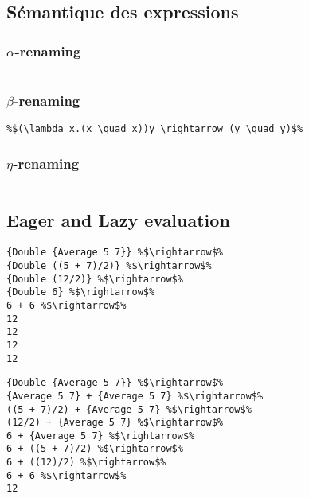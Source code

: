 \documentclass{report}
\begin{document}
\subsection{Sémantique des expressions}
\subsubsection{$\alpha$-renaming}
\begin{lstlisting}[escapechar=\%]
%$\lambda$% x. x %$\rightarrow_{\alpha}\lambda$%y. y
\end{lstlisting}
\subsubsection{$\beta$-renaming}
\begin{lstlisting}[escapechar=\%]
%$(\lambda x.t_1) t_2 \rightarrow t_1[::=t_2]$%
%$(\lambda x.(x \quad x))y \rightarrow (y \quad y)$%
\end{lstlisting}
\subsubsection{$\eta$-renaming}
\begin{lstlisting}[escapechar=\%]
%$\lambda x.(t \quad x) \rightarrow t$ if $x \notin FV(t)$%
\end{lstlisting}

\subsection{Eager and Lazy evaluation}
\begin{center}
\begin{minipage}[t]{0.49\linewidth}
\begin{lstlisting}[escapechar=\%]
{Double {Average 5 7}} %$\rightarrow$%
{Double ((5 + 7)/2)} %$\rightarrow$%
{Double (12/2)} %$\rightarrow$%
{Double 6} %$\rightarrow$%
6 + 6 %$\rightarrow$%
12
12
12
12
\end{lstlisting}
\end{minipage}
%
\begin{minipage}[t]{0.45\linewidth}
\begin{lstlisting}[escapechar=\%]
{Double {Average 5 7}} %$\rightarrow$%
{Average 5 7} + {Average 5 7} %$\rightarrow$%
((5 + 7)/2) + {Average 5 7} %$\rightarrow$%
(12/2) + {Average 5 7} %$\rightarrow$%
6 + {Average 5 7} %$\rightarrow$%
6 + ((5 + 7)/2) %$\rightarrow$%
6 + ((12)/2) %$\rightarrow$%
6 + 6 %$\rightarrow$%
12
\end{lstlisting}
\end{minipage}
\end{center}
\end{document}
